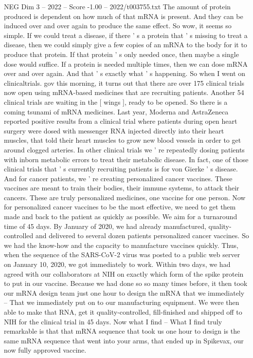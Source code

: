 \begin{textsample}{NEG Dim 3 – 2022 – Score -1.00 – 2022/t003755.txt}
The amount of protein produced is dependent on how much of that mRNA is present.
And they can be induced over and over again to produce the same effect.
So wow, it seems so simple.
If we could treat a disease, if there ' s a protein that ' s missing to treat a disease, then we could simply give a few copies of an mRNA to the body for it to produce that protein.
If that protein ' s only needed once, then maybe a single dose would suffice.
If a protein is needed multiple times, then we can dose mRNA over and over again.
And that ' s exactly what ' s happening.
So when I went on clinicaltrials. gov this morning, it turns out that there are over 175 clinical trials now open using mRNA-based medicines that are recruiting patients.
Another 54 clinical trials are waiting in the [ wings ], ready to be opened.
So there is a coming tsunami of mRNA medicines.
Last year, Moderna and AstraZeneca reported positive results from a clinical trial where patients during open heart surgery were dosed with messenger RNA injected directly into their heart muscles, that told their heart muscles to grow new blood vessels in order to get around clogged arteries.
In other clinical trials we ' re repeatedly dosing patients with inborn metabolic errors to treat their metabolic disease.
In fact, one of those clinical trials that ' s currently recruiting patients is for von Gierke ' s disease.
And for cancer patients, we ' re creating personalized cancer vaccines.
These vaccines are meant to train their bodies, their immune systems, to attack their cancers.
These are truly personalized medicines, one vaccine for one person.
Now for personalized cancer vaccines to be the most effective, we need to get them made and back to the patient as quickly as possible.
We aim for a turnaround time of 45 days.
By January of 2020, we had already manufactured, quality-controlled and delivered to several dozen patients personalized cancer vaccines.
So we had the know-how and the capacity to manufacture vaccines quickly.
Thus, when the sequence of the SARS-CoV-2 virus was posted to a public web server on January 10, 2020, we got immediately to work.
Within two days, we had agreed with our collaborators at NIH on exactly which form of the spike protein to put in our vaccine.
Because we had done so so many times before, it then took our mRNA design team just one hour to design the mRNA that we immediately -- That we immediately put on to our manufacturing equipment.
We were then able to make that RNA, get it quality-controlled, fill-finished and shipped off to NIH for the clinical trial in 45 days.
Now what I find -- What I find truly remarkable is that that mRNA sequence that took us one hour to design is the same mRNA sequence that went into your arms, that ended up in Spikevax, our now fully approved vaccine.

\end{textsample}
